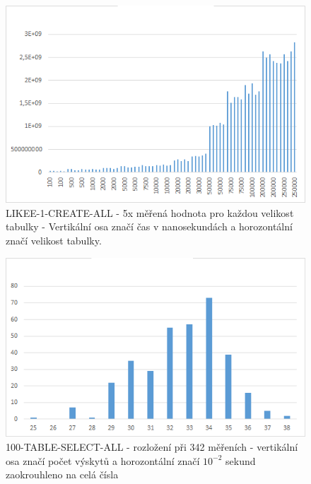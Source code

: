 \documentclass[a4paper, 11pt]{article}
\begin{document}
\begin{figure}[H]
\centering
\includegraphics[width=150mm, frame]{images/LIKEE-1-CREATE-ALL.png}
\caption{LIKEE-1-CREATE-ALL - 5x měřená hodnota pro každou velikost tabulky - Vertikální osa značí čas v nanosekundách a horozontální značí velikost tabulky.}
\label{sec:obr1}
\end{figure}

\begin{figure}[H]
\centering
\includegraphics[width=150mm, frame]{images/100-TABLE-SELECT-ALL-342.png}
\caption{100-TABLE-SELECT-ALL - rozložení při 342 měřeních - vertikální osa značí počet výskytů a horozontální značí $10^{-2}$ sekund zaokrouhleno na celá čísla}
\label{sec:obr3}
\end{figure}
\end{document}
